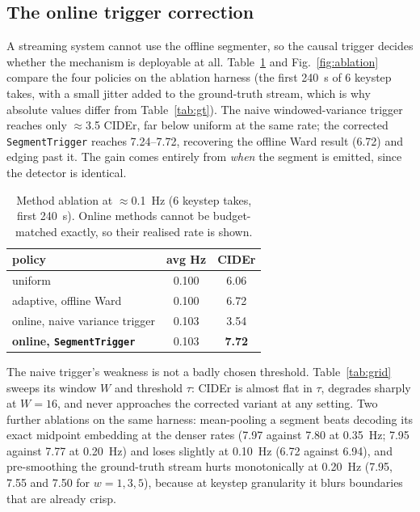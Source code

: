 \documentclass[journal]{IEEEtran}
\begin{document}
\subsection{The online trigger correction}
\label{sec:trigger-results}
A streaming system cannot use the offline segmenter, so the causal trigger decides
whether the mechanism is deployable at all. Table~\ref{tab:ablation} and
Fig.~\ref{fig:ablation} compare the four policies on the ablation harness (the first 240~s of 6 keystep takes, with a
small jitter added to the ground-truth stream, which is why absolute values differ
from Table~\ref{tab:gt}). The naive windowed-variance trigger reaches only
$\approx$3.5 CIDEr, far below uniform at the same rate; the corrected
\texttt{SegmentTrigger} reaches 7.24--7.72, recovering the offline Ward result
(6.72) and edging past it. The gain comes entirely from \emph{when} the segment is
emitted, since the detector is identical.

\begin{table}[t]
\caption{Method ablation at $\approx$0.1~Hz (6 keystep takes, first 240~s).
Online methods cannot be budget-matched exactly, so their realised rate is shown.}
\label{tab:ablation}
\centering
\footnotesize
\setlength{\tabcolsep}{5pt}
\begin{tabular}{lcc}
\toprule
policy & avg Hz & CIDEr \\
\midrule
uniform & 0.100 & 6.06 \\
adaptive, offline Ward & 0.100 & 6.72 \\
online, naive variance trigger & 0.103 & 3.54 \\
\textbf{online, \texttt{SegmentTrigger}} & 0.103 & \textbf{7.72} \\
\bottomrule
\end{tabular}
\end{table}

The naive trigger's weakness is not a badly chosen threshold.
Table~\ref{tab:grid} sweeps its window $W$ and threshold $\tau$: CIDEr is almost
flat in $\tau$, degrades sharply at $W=16$, and never approaches the corrected
variant at any setting. Two further ablations on the same harness: mean-pooling a
segment beats decoding its exact midpoint embedding at the denser rates (7.97
against 7.80 at 0.35~Hz; 7.95 against 7.77 at 0.20~Hz) and loses slightly at
0.10~Hz (6.72 against 6.94), and pre-smoothing the ground-truth stream hurts
monotonically at 0.20~Hz (7.95, 7.55 and 7.50 for $w=1,3,5$), because at keystep
granularity it blurs boundaries that are already crisp.
\end{document}
